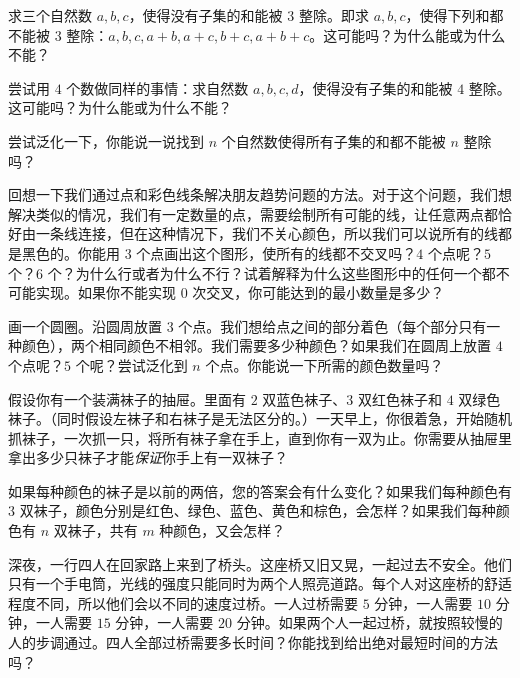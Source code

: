 \begin{exercise}
    求三个自然数 $a,b,c$，使得没有子集的和能被 $3$ 整除。即求 $a,b,c$，使得下列和都不能被 $3$ 整除：$a,b,c,a + b,a + c,b + c,a + b + c$。这可能吗？为什么能或为什么不能？

    尝试用 $4$ 个数做同样的事情：求自然数 $a,b,c,d$，使得没有子集的和能被 $4$ 整除。这可能吗？为什么能或为什么不能？

    尝试泛化一下，你能说一说找到 $n$ 个自然数使得所有子集的和都不能被 $n$ 整除吗？
\end{exercise}

\begin{exercise}
    回想一下我们通过点和彩色线条解决朋友趋势问题的方法。对于这个问题，我们想解决类似的情况，我们有一定数量的点，需要绘制所有可能的线，让任意两点都恰好由一条线连接，但在这种情况下，我们不关心颜色，所以我们可以说所有的线都是黑色的。你能用 $3$ 个点画出这个图形，使所有的线都不交叉吗？$4$ 个点呢？$5$ 个？$6$ 个？为什么行或者为什么不行？试着解释为什么这些图形中的任何一个都不可能实现。如果你不能实现 $0$ 次交叉，你可能达到的最小数量是多少？
\end{exercise}

\begin{exercise}
    画一个圆圈。沿圆周放置 $3$ 个点。我们想给点之间的部分着色（每个部分只有一种颜色），两个相同颜色不相邻。我们需要多少种颜色？如果我们在圆周上放置 $4$ 个点呢？$5$ 个呢？尝试泛化到 $n$ 个点。你能说一下所需的颜色数量吗？
\end{exercise}

\begin{exercise}
    假设你有一个装满袜子的抽屉。里面有 $2$ 双蓝色袜子、$3$ 双红色袜子和 $4$ 双绿色袜子。（同时假设左袜子和右袜子是无法区分的。）一天早上，你很着急，开始随机抓袜子，一次抓一只，将所有袜子拿在手上，直到你有一双为止。你需要从抽屉里拿出多少只袜子才能\emph{保证}你手上有一双袜子？

    如果每种颜色的袜子是以前的两倍，您的答案会有什么变化？如果我们每种颜色有 $3$ 双袜子，颜色分别是红色、绿色、蓝色、黄色和棕色，会怎样？如果我们每种颜色有 $n$ 双袜子，共有 $m$ 种颜色，又会怎样？
\end{exercise}

\begin{exercise}
    深夜，一行四人在回家路上来到了桥头。这座桥又旧又晃，一起过去不安全。他们只有一个手电筒，光线的强度只能同时为两个人照亮道路。每个人对这座桥的舒适程度不同，所以他们会以不同的速度过桥。一人过桥需要 $5$ 分钟，一人需要 $10$ 分钟，一人需要 $15$ 分钟，一人需要 $20$ 分钟。如果两个人一起过桥，就按照较慢的人的步调通过。四人全部过桥需要多长时间？你能找到给出绝对最短时间的方法吗？
\end{exercise}

